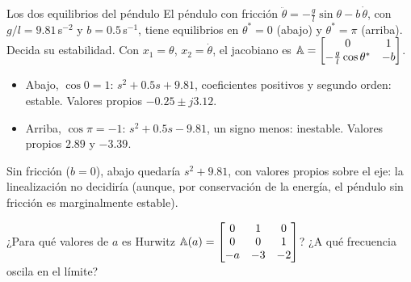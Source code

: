 \begin{ejemplo}[label=ej:es-pendulo]{Los dos equilibrios del péndulo}
El péndulo con fricción $\ddot\theta=-\frac{g}{l}\sin\theta-b\,\dot\theta$, con $g/l=9.81$\,s$^{-2}$ y $b=0.5$\,s$^{-1}$, tiene equilibrios en $\theta^*=0$ (abajo) y $\theta^*=\pi$ (arriba). Decida su estabilidad.
\solucion Con $x_1=\theta$, $x_2=\dot\theta$, el jacobiano es $\mathbb{A}=\begin{bmatrix}0&1\\-\frac{g}{l}\cos\theta^*&-b\end{bmatrix}$.
\begin{itemize}
  \item Abajo, $\cos0=1$: $s^2+0.5s+9.81$, coeficientes positivos y segundo orden: estable. Valores propios $-0.25\pm j3.12$.
  \item Arriba, $\cos\pi=-1$: $s^2+0.5s-9.81$, un signo menos: inestable. Valores propios $2.89$ y $-3.39$.
\end{itemize}
Sin fricción ($b=0$), abajo quedaría $s^2+9.81$, con valores propios sobre el eje: la linealización no decidiría (aunque, por conservación de la energía, el péndulo sin fricción es marginalmente estable).
\end{ejemplo}

\begin{pausa}
¿Para qué valores de $a$ es Hurwitz $\mathbb{A}(a)=\begin{bmatrix}0&1&0\\0&0&1\\-a&-3&-2\end{bmatrix}$? ¿A qué frecuencia oscila en el límite?
\end{pausa}
